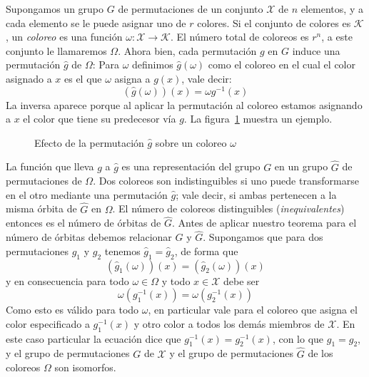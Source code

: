   Supongamos un grupo \(G\) de permutaciones
  de un conjunto \(\mathcal{X}\) de \(n\) elementos,
  y a cada elemento se le puede asignar uno de \(r\) colores.
  Si el conjunto de colores es \(\mathcal{K}\),
  un \emph{coloreo}
  es una función
    \(\omega \colon \mathcal{X} \rightarrow \mathcal{K}\).
  El número total de coloreos es \(r^n\),
  a este conjunto le llamaremos \(\Omega\).
  Ahora bien,
  cada permutación \(g\) en \(G\)
  induce una permutación \(\widehat{g}\) de \(\Omega\):
  Para \(\omega\) definimos \(\widehat{g}(\omega)\)
  como el coloreo en el cual el color asignado a \(x\)
  es el que \(\omega\) asigna a \(g(x)\),
  vale decir:
  \begin{equation*}
    (\widehat{g}(\omega))(x) = \omega g^{-1}(x)
  \end{equation*}
  La inversa aparece porque al aplicar la permutación al coloreo
  estamos asignando a \(x\)
  el color que tiene su predecesor vía \(g\).
  La figura~\ref{fig:g-hat} muestra un ejemplo.
  \begin{figure}[htbp]
    \centering
    \hspace{3em}%
    \caption{Efecto de la permutación $\widehat{g}$
	     sobre un coloreo $\omega$}
    \label{fig:g-hat}
  \end{figure}
  La función que lleva \(g\) a \(\widehat{g}\)
  es una representación del grupo \(G\)
  en un grupo \(\widehat{G}\) de permutaciones de \(\Omega\).
  Dos coloreos son indistinguibles
  si uno puede transformarse en el otro
  mediante una permutación \(\widehat{g}\);
  vale decir,
  si ambas pertenecen a la misma órbita
  de \(\widehat{G}\) en \(\Omega\).
  El número de coloreos distinguibles
  (\emph{inequivalentes})
  entonces es el número de órbitas de \(\widehat{G}\).
  Antes de aplicar nuestro teorema para el número de órbitas
  debemos relacionar \(G\) y \(\widehat{G}\).
  Supongamos que para dos permutaciones \(g_1\) y \(g_2\)
  tenemos \(\widehat{g}_1 = \widehat{g}_2\),
  de forma que
  \begin{equation*}
    (\widehat{g}_1(\omega))(x) = (\widehat{g}_2(\omega))(x)
  \end{equation*}
  y en consecuencia para todo \(\omega \in \Omega\)
  y todo \(x \in \mathcal{X}\) debe ser
  \begin{equation*}
    \omega(g_1^{-1}(x)) = \omega(g_2^{-1}(x))
  \end{equation*}
  Como esto es válido para todo \(\omega\),
  en particular vale para el coloreo
  que asigna el color especificado a \(g_1^{-1}(x)\)
  y otro color a todos los demás miembros de \(\mathcal{X}\).
  En este caso particular la ecuación
  dice que \(g_1^{-1}(x) = g_2^{-1}(x)\),
  con lo que \(g_1 = g_2\),
  y el grupo de permutaciones \(G\) de \(\mathcal{X}\)
  y el grupo de permutaciones \(\widehat{G}\)
  de los coloreos \(\Omega\) son isomorfos.

